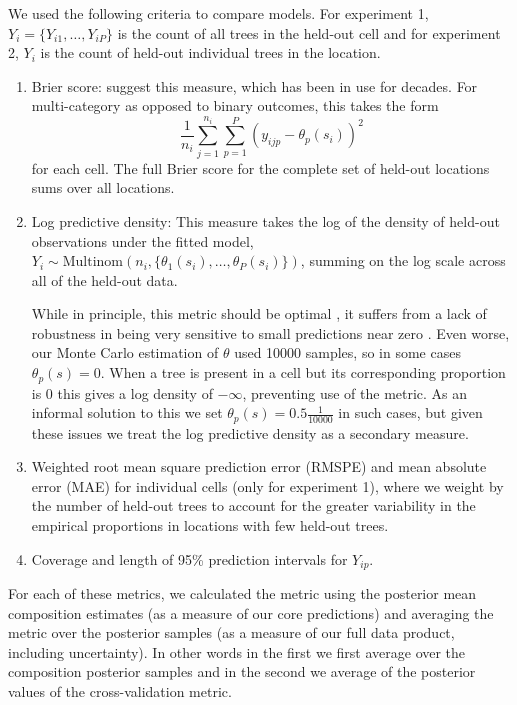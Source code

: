 \documentclass[12pt]{article}\usepackage[]{graphicx}\usepackage[]{color}
\begin{document}
We used the following criteria to compare models. For experiment 1,
$Y_{i}=\{Y_{i1},\ldots,Y_{iP}\}$ is the count of all trees in the
held-out cell and for experiment 2, $Y_{i}$ is the count of held-out
individual trees in the location.
\begin{enumerate}
\item Brier score: \citep{Gnei:etal:2007} suggest this measure, which has
been in use for decades. For multi-category as opposed to binary outcomes,
this takes the form
\[
\frac{1}{n_{i}}\sum_{j=1}^{n_{i}}\sum_{p=1}^{P}(y_{ijp}-\theta_{p}(s_{i}))^{2}
\]
for each cell. The full Brier score for the complete set of held-out
locations sums over all locations.
\item Log predictive density: This measure takes the log of the density
of held-out observations under the fitted model, $Y_{i}\sim\mbox{Multinom}(n_{i},\{\theta_{1}(s_{i}),\ldots,\theta_{P}(s_{i})\})$,
summing on the log scale across all of the held-out data. 


While in principle, this metric should be optimal \citep{Krnj:Drap:2014},
it suffers from a lack of robustness in being very sensitive to small
predictions near zero \citep{Gnei:etal:2007}. Even worse, our Monte
Carlo estimation of $\theta$ used 10000 samples, so in some cases
$\theta_{p}(s)=0$. When a tree is present in a cell but its corresponding
proportion is 0 this gives a log density of $-\infty$, preventing
use of the metric. As an informal solution to this we set $\theta_{p}(s)=0.5\frac{1}{10000}$
in such cases, but given these issues we treat the log predictive
density as a secondary measure.

\item Weighted root mean square prediction error (RMSPE) and mean absolute
error (MAE) for individual cells (only for experiment 1), where we
weight by the number of held-out trees to account for the greater
variability in the empirical proportions in locations with few held-out
trees. 
\item Coverage and length of 95\% prediction intervals for $Y_{ip}$. 
\end{enumerate}
For each of these metrics, we calculated the metric using the posterior
mean composition estimates (as a measure of our core predictions)
and averaging the metric over the posterior samples (as a measure
of our full data product, including uncertainty). In other words in
the first we first average over the composition posterior samples
and in the second we average of the posterior values of the cross-validation
metric.
\end{document}
